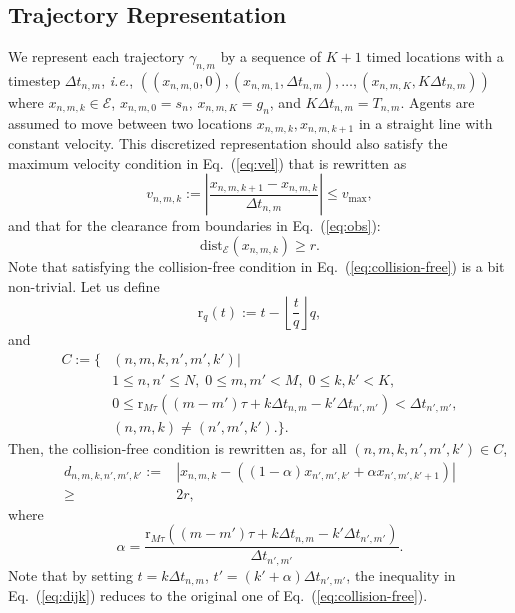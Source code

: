 \documentclass[letterpaper]{article} %
\def\ie{{\it i.e.}}
\begin{document}
\subsection{Trajectory Representation}
We represent each trajectory $\gamma_{n, m}$ by a sequence of $K+1$ timed locations with a timestep $\Delta t_{n, m}$, \ie, $((x_{n, m, 0}, 0), (x_{n, m, 1}, \Delta t_{n, m}), \ldots, (x_{n, m, K}, K\Delta t_{n, m}))$ where $x_{n, m, k} \in \mathcal{E}$, $x_{n, m, 0} =s_n$, $x_{n, m, K}=g_n$, and $K\Delta t_{n, m} = T_{n, m}$. Agents are assumed to move between two locations $x_{n,m,k}, x_{n,m,k+1}$ in a straight line with constant velocity.
This discretized representation should also satisfy the maximum velocity condition in Eq.~(\ref{eq:vel}) that is rewritten as
\begin{equation}
v_{n,m,k}:=\left|\frac{x_{n,m,k+1}-x_{n,m,k}}{\Delta t_{n,m}}\right|\leq v_{\mathrm{max}},
\end{equation}
and that for the clearance from boundaries in Eq.~(\ref{eq:obs}):
\begin{equation}
\mathrm{dist}_{\mathcal{E}}(x_{n,m,k})\geq r.
\end{equation}
Note that satisfying the collision-free condition in Eq.~(\ref{eq:collision-free}) is a bit non-trivial. Let us define
\begin{equation}
    \mathrm{r}_q(t) := t-\left\lfloor \frac{t}{q}\right\rfloor q,
\end{equation}
and
\begin{equation}
\begin{split}
C:=\{&(n,m,k,n',m',k')|\\
&1\leq n,n'\leq N,\; 0\leq m,m'<M,\; 0\leq k,k'<K,\\
&0 \leq \mathrm{r}_{M\tau}((m-m')\tau+k\Delta t_{n,m}-k'\Delta t_{n',m'}) < \Delta t_{n',m'},\\
&(n,m,k)\neq(n',m',k').\}.
\end{split}
\end{equation}
Then, the collision-free condition is rewritten as, for all $(n,m,k,n',m',k')\in C$,
\begin{equation}\label{eq:dijk}
\begin{split}
d_{n,m,k,n',m',k'}:=&\left|x_{n,m,k}-((1-\alpha)x_{n',m',k'}+\alpha x_{n',m',k'+1})\right| \\ \geq& 2r,
\end{split}
\end{equation}
where
\begin{equation}
    \alpha = \frac{\mathrm{r}_{M\tau}((m-m')\tau+k\Delta t_{n,m}-k'\Delta t_{n',m'})}{\Delta t_{n',m'}}.
\end{equation}
Note that by setting $t=k\Delta t_{n,m}$, $t'=(k'+\alpha)\Delta t_{n',m'}$, the inequality in Eq.~(\ref{eq:dijk}) reduces to the original one of Eq.~(\ref{eq:collision-free}).
\end{document}
